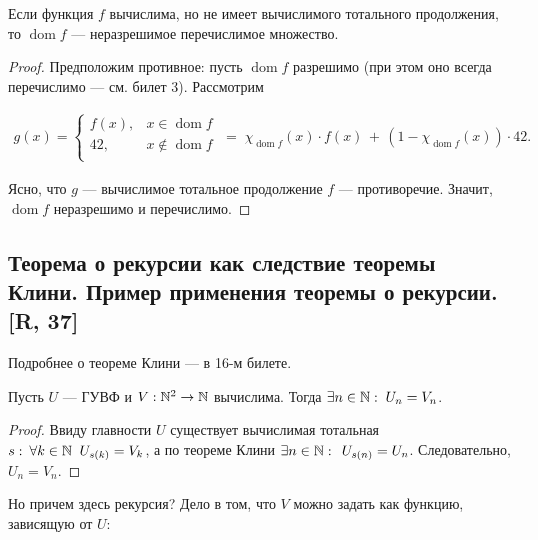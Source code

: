 \documentclass[a4paper, fleqn]{article}
\DeclareMathOperator{\dom}{\mathop{\mathrm{dom}}}
\begin{document}
        \begin{proposition}
        Если функция $f$ вычислима, но не имеет вычислимого тотального продолжения, то $\dom f$ --- неразрешимое перечислимое множество.
        \end{proposition}

        \begin{proof}
        Предположим противное: пусть $\dom f$ разрешимо (при этом оно всегда перечислимо --- см. билет 3). Рассмотрим

        \begin{equation*}
        \begin{gathered}
        g(x) =
        \begin{cases}
        f(x), & x \in \dom f \\
        42, & x \notin \dom f \\
        \end{cases}
        \; = \;\chi_{\dom f}(x) \cdot f(x) \,+\, (1 - \chi_{\dom f}(x)) \cdot 42.
        \end{gathered}
        \end{equation*}

        Ясно, что $g$ --- вычислимое тотальное продолжение $f$ --- противоречие. Значит, $\dom f$ неразрешимо и перечислимо.
        \end{proof}

    \subsection{Теорема о рекурсии как следствие теоремы Клини. Пример применения теоремы о рекурсии. [R, 37]}

        Подробнее о теореме Клини --- в 16-м билете.

        \begin{theorem}[о рекурсии]
        Пусть $U$ --- ГУВФ и $V : \mathbb{N}^2 \to \mathbb{N}$ вычислима. Тогда $\exists n \in \mathbb{N} : \; U_n = V_n$.
        \end{theorem}

        \begin{proof}
        Ввиду главности $U$ существует вычислимая тотальная $s : \: \forall k \in \mathbb{N} \;\; U_{s(k)} = V_k$, а по теореме Клини $\exists n \in \mathbb{N} : \;\, U_{s(n)} = U_n$. Следовательно, $U_n = V_n$.
        \end{proof}

        Но причем здесь рекурсия? Дело в том, что $V$ можно задать как функцию, зависящую от $U$:
\end{document}
